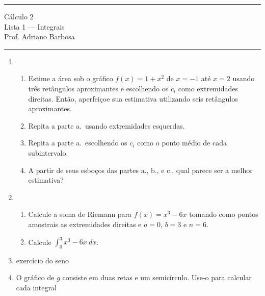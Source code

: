 \documentclass{article}
\begin{document}
\noindent{}\rule{\textwidth}{0.4pt}
\begin{center}
	C\'alculo 2\\
	Lista 1 --- Integrais \\
	\vspace{0.2cm}
	Prof. Adriano Barbosa
\end{center}
\noindent{}\rule{\textwidth}{0.4pt}

\begin{enumerate}
\item
\begin{enumerate}[label=\alph*.]
	\item Estime a \'area sob o gr\'afico $f(x) = 1 + x^2$ de $x = -1$ at\'e $x = 2$
		usando tr\^es ret\^angulos aproximantes e escolhendo os $c_i$ como
		extremidades direitas. Ent\~ao, aperfei\c{c}oe sua estimativa utilizando seis
		ret\^angulos aproximantes.
	\item Repita a parte a.\ usando extremidades esquerdas.
	\item Repita a parte a.\ escolhendo os $c_i$ como o ponto m\'edio de cada subintervalo.
	\item A partir de seus esbo\c{c}os das partes a., b., e c., qual parece ser a melhor estimativa?
\end{enumerate}

\item
\begin{enumerate}[label=\alph*.]
	\item Calcule a soma de Riemann para $f(x) = x^3 - 6x$ tomando como pontos
		amostrais as extremidades direitas e $a = 0$, $b = 3$ e $n = 6$.
	\item Calcule $\int_0^3 x^3 - 6x\ dx$.
\end{enumerate}

\item exerc\'{i}cio do seno

\item O gr\'afico de $g$ consiste em duas retas e um semic\'{i}rculo. Use-o para
	calcular cada integral



\end{enumerate}
\end{document}
